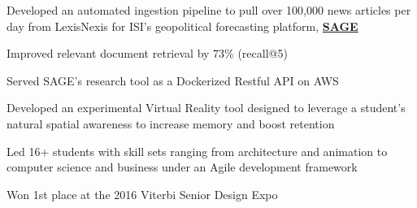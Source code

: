 \documentclass[letterpaper]{deedy-resume} %
\begin{document}
\begin{minipage}[t]{0.66\textwidth}
\begin{tightitemize}
\item Developed an automated ingestion pipeline to pull over 100,000 news articles per day from LexisNexis for ISI’s geopolitical forecasting platform, \href{https://sage-platform.isi.edu}{\bf SAGE}
\item Improved relevant document retrieval by 73\% (recall@5) 
\item Served SAGE’s research tool as a Dockerized Restful API on AWS  
\end{tightitemize}



\sectionspace %




\vspace{\topsep} %

\begin{tightitemize}
\item Developed an experimental Virtual Reality tool designed to leverage a student’s natural spatial awareness to increase memory and boost retention
\item Led 16+ students with skill sets ranging from architecture and animation to computer science and business under an Agile development framework
\item Won 1st place at the 2016 Viterbi Senior Design Expo 
\end{tightitemize}

\sectionspace



\vspace{\topsep} %


\end{minipage}
\end{document}
